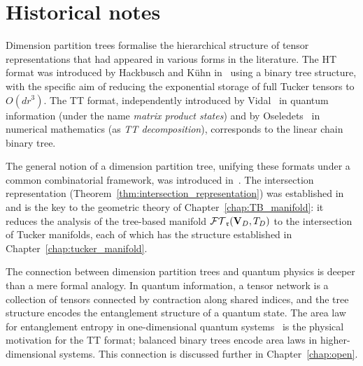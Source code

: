 \section{Historical notes}
\label{sec:trees:history}

Dimension partition trees formalise the hierarchical structure of
tensor representations that had appeared in various forms in the
literature. The HT format was introduced by Hackbusch and Kühn
in~\cite{HaKuehn2009} using a binary tree structure, with the specific
aim of reducing the exponential storage of full Tucker tensors to
$O(d r^3)$. The TT format, independently introduced by Vidal~\cite{Vidal2003}
in quantum information (under the name \emph{matrix product states}) and
by Oseledets~\cite{Oseledets2011} in numerical mathematics
(as \emph{TT decomposition}), corresponds to the linear chain binary tree.

The general notion of a dimension partition tree, unifying these formats
under a common combinatorial framework, was introduced in~\cite{FHN2021}.
The intersection representation (Theorem~\ref{thm:intersection_representation})
was established in~\cite{FHN2023} and is the key to the geometric theory
of Chapter~\ref{chap:TB_manifold}: it reduces the analysis of the
tree-based manifold $\mathcal{FT}_{\mathfrak{r}}(\mathbf{V}_D,T_D)$ to the intersection of Tucker manifolds, each
of which has the structure established in Chapter~\ref{chap:tucker_manifold}.

The connection between dimension partition trees and quantum physics
is deeper than a mere formal analogy. In quantum information, a tensor
network is a collection of tensors connected by contraction along shared
indices, and the tree structure encodes the entanglement structure of a
quantum state. The area law for entanglement entropy in one-dimensional
quantum systems~\cite{Vidal2003} is the physical motivation for the TT
format; balanced binary trees encode area laws in higher-dimensional
systems. This connection is discussed further in
Chapter~\ref{chap:open}.

